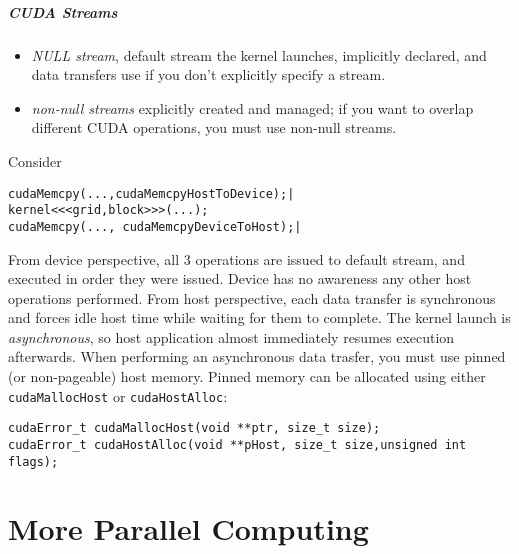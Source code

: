 \documentclass[10pt]{amsart}
\begin{document}
\begin{multicols*}{2}
\subsubsection{CUDA Streams}
\begin{itemize}
	\item \emph{NULL stream}, default stream the kernel launches, implicitly declared, and data transfers use if you don't explicitly specify a stream.  
	\item \emph{non-null streams} explicitly created and managed; if you want to overlap different CUDA operations, you must use non-null streams.  
\end{itemize}
Consider 
\begin{lstlisting}
cudaMemcpy(...,cudaMemcpyHostToDevice);|
kernel<<<grid,block>>>(...);
cudaMemcpy(..., cudaMemcpyDeviceToHost);|
\end{lstlisting}
From device perspective, all 3 operations are issued to default stream, and executed in order they were issued.  Device has no awareness any other host operations performed.  
From host perspective, each data transfer is synchronous and forces idle host time while waiting for them to complete.  The kernel launch is \emph{asynchronous}, so host application almost immediately resumes execution afterwards.  
When performing an asynchronous data trasfer, you must use pinned (or non-pageable) host memory.  Pinned memory can be allocated using either \verb|cudaMallocHost| or \verb|cudaHostAlloc|:  
\begin{lstlisting}
cudaError_t cudaMallocHost(void **ptr, size_t size);
cudaError_t cudaHostAlloc(void **pHost, size_t size,unsigned int flags);
\end{lstlisting}
\part{More Parallel Computing}

\end{multicols*}
\end{document}

